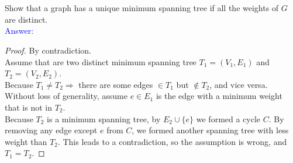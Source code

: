 \documentclass[a4paper]{article}
\begin{document}
\section{} Show that a graph has a unique minimum spanning tree if all the weights of $G$ are distinct.\\
\textcolor{blue}{Answer:}
\begin{proof} By contradiction.\\
    Assume that are two distinct minimum spanning tree $T_1=(V_1, E_1)$ and $T_2=(V_2,E_2)$.\\
    Because $T_1\neq T_2\Rightarrow $ there are some edges $\in T_1$ but $\notin T_2$, and vice versa.\\
    Without loss of generality, assume $e\in E_1$ is the edge with a minimum weight that is not in $T_2$.\\
    Because $T_2$ is a minimum spanning tree, by $E_2\cup \{e\}$ we formed a cycle $C$. By removing any edge except $e$ from $C$, we formed another spanning tree with less weight than $T_2$. This leads to a contradiction, so the assumption is wrong, and $T_1=T_2$.
\end{proof}
\end{document}
